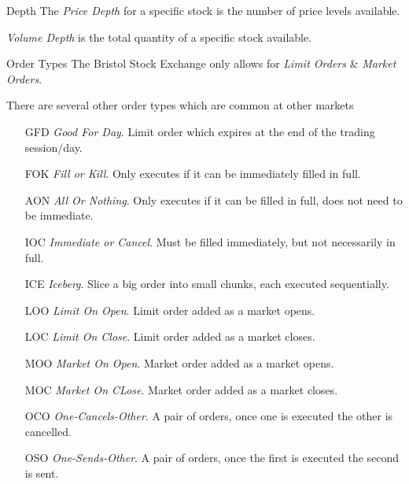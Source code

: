 \documentclass[11pt,a4paper]{article}
\begin{document}
  \begin{definition}{Depth}
    The \textit{Price Depth} for a specific stock is the number of price levels available.
    \par \textit{Volume Depth} is the total quantity of a specific stock available.
  \end{definition}

  \begin{proposition}{Order Types}
    The Bristol Stock Exchange only allows for \textit{Limit Orders} \& \textit{Market Orders}.
    \par There are several other order types which are common at other markets
    \begin{itemize}
      \item[GFD] \textit{Good For Day}. Limit order which expires at the end of the trading session/day.
      \item[FOK] \textit{Fill or Kill}. Only executes if it can be immediately filled in full.
      \item[AON] \textit{All Or Nothing}. Only executes if it can be filled in full, does not need to be immediate.
      \item[IOC] \textit{Immediate or Cancel}. Must be filled immediately, but not necessarily in full.
      \item[ICE] \textit{Iceberg}. Slice a big order into small chunks, each executed sequentially.
      \item[LOO] \textit{Limit On Open}. Limit order added as a market opens.
      \item[LOC] \textit{Limit On Close}. Limit order added as a market closes.
      \item[MOO] \textit{Market On Open}. Market order added as a market opens.
      \item[MOC] \textit{Market On CLose}. Market order added as a market closes.
      \item[OCO] \textit{One-Cancels-Other}. A pair of orders, once one is executed the other is cancelled.
      \item[OSO] \textit{One-Sends-Other}. A pair of orders, once the first is executed the second is sent.
    \end{itemize}
  \end{proposition}
\end{document}
